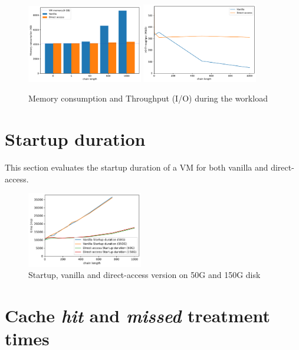 \documentclass[sigplan,screen,10pt]{acmart}
\begin{document}
	\begin{figure}[h]
		\center
		\includegraphics[width=0.45\textwidth]{memory_consumption.pdf}
		\includegraphics[width=0.45\textwidth]{workload_dd_throughput.pdf}
		\caption{Memory consumption and Throughput (I/O) during the workload}
		\label{fig:fig3}
	\end{figure}
	
	\section*{Startup duration}
	This section evaluates the startup duration of a VM for both vanilla and direct-access.
	
	\begin{figure}[h]
		\center
		\includegraphics[width=0.45\textwidth]{startup_duration.pdf}
		\caption{Startup, vanilla and direct-access version on 50G and 150G disk}
		\label{fig:fig34}
	\end{figure}

	\section*{Cache \emph{hit} and \emph{missed} treatment times}
	
\end{document}
